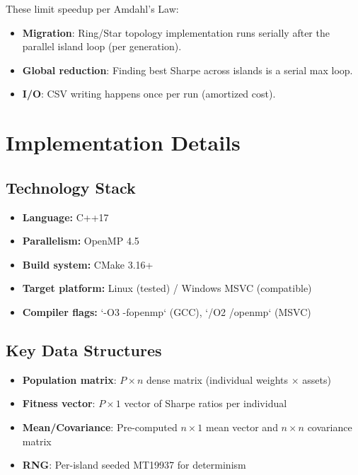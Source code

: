 \documentclass[12pt,a4paper]{article}
\begin{document}
These limit speedup per Amdahl's Law:

\begin{itemize}
	\item \textbf{Migration}: Ring/Star topology implementation runs serially after the parallel island loop (per generation).
	\item \textbf{Global reduction}: Finding best Sharpe across islands is a serial max loop.
	\item \textbf{I/O}: CSV writing happens once per run (amortized cost).
\end{itemize}

\newpage
\section{Implementation Details}

\subsection{Technology Stack}

\begin{itemize}
	\item \textbf{Language:} C++17
	\item \textbf{Parallelism:} OpenMP 4.5
	\item \textbf{Build system:} CMake 3.16+
	\item \textbf{Target platform:} Linux (tested) / Windows MSVC (compatible)
	\item \textbf{Compiler flags:} `-O3 -fopenmp` (GCC), `/O2 /openmp` (MSVC)
\end{itemize}

\subsection{Key Data Structures}

\begin{itemize}
	\item \textbf{Population matrix}: $P \times n$ dense matrix (individual weights $\times$ assets)
	\item \textbf{Fitness vector}: $P \times 1$ vector of Sharpe ratios per individual
	\item \textbf{Mean/Covariance}: Pre-computed $n \times 1$ mean vector and $n \times n$ covariance matrix
	\item \textbf{RNG}: Per-island seeded MT19937 for determinism
\end{itemize}
\end{document}

